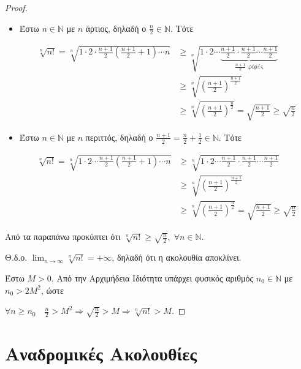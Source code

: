 \documentclass[main.tex]{subfiles}
\begin{document}
\begin{proof}
\item {}
    \begin{itemize}
        \item 
            Έστω $ n \in \mathbb{N} $ με $ n $ άρτιος, δηλαδή ο 
            $ \frac{n}{2} \in \mathbb{N} $. Τότε

            \begin{align*}
                \sqrt[n]{n!} = \sqrt[n]{1 \cdot 2 \cdot \frac{n+1}{2}
                \left(\frac{n+1}{2} +1\right) \cdots n} 
                    &\geq \sqrt[n]{1\cdot 2 \cdots
                        \underbrace{\frac{n+1}{2} \cdot \frac{n+1}{2} 
                            \cdots \frac{n+1}{2}}_{\frac{n+1}{2} \; 
                    \text{φορές}}} \\
                    &\geq \sqrt[n]{\left(\frac{n+1}{2}\right)^
                    {\frac{n+1}{2}}} \\ 
                    &\geq \sqrt[n]{\left(\frac{n+1}{2}\right)^
                    {\frac{n}{2}}} = \sqrt{ \frac{n+1}{2} } \geq 
                    \sqrt{\frac{n}{2}} 
            \end{align*} 

        \item Έστω $ n \in \mathbb{N} $ με $ n $ περιττός, δηλαδή ο $
            \frac{n+1}{2} = \frac{n}{2} + \frac{1}{2} \in \mathbb{N} $.
            Τότε

            \begin{align*}
                \sqrt[n]{n!} = \sqrt[n]{1\cdot 2 \cdots \frac{n+1}{2}
                \left(\frac{n+1}{2} +1\right) \cdots n}
             &\geq \sqrt[n]{1 \cdot 2 \cdots
             \frac{n+1}{2}  \cdot \frac{n+1}{2} \cdots \frac{n+1}{2} } \\ 
             &\geq 
             \sqrt[n]{\left(\frac{n+1}{2} \right)^{\frac{n+1}{2}}} \\ 
             & \geq
             \sqrt[n]{\left(\frac{n+1}{2} \right)^{\frac{n}{2}}} = 
             \sqrt{\frac{n+1}{2}} \geq 
             \sqrt{\frac{n}{2}}
            \end{align*}
    \end{itemize}

    Από τα παραπάνω προκύπτει ότι $ \sqrt[n]{n!} \geq \sqrt{\frac{n}{2}
    }, \; \forall n \in \mathbb{N} $. 

    Θ.δ.ο. $ \lim_{n \to \infty} \sqrt[n]{n!} = + \infty $, 
    δηλαδή ότι η ακολουθία αποκλίνει.

    Έστω $ M >0 $. Από την Αρχιμήδεια Ιδιότητα υπάρχει 
    φυσικός αριθμός $ 
    n_{0} \in  \mathbb{N} $ με $ n_{0}>2M^{2} $, ώστε 

    $ \forall n \geq n_{0} \quad \frac{n}{2} > M^{2} \Rightarrow
    \sqrt{\frac{n}{2}} > M \Rightarrow \sqrt[n]{n!} > M $. 
\end{proof}




\section{Αναδρομικές Ακολουθίες}
\end{document}
